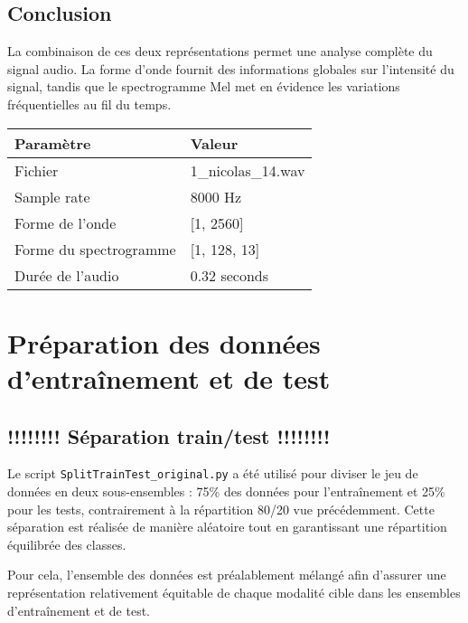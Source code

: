 \documentclass[11pt,a4paper]{article}
\begin{document}
\subsection{Conclusion}
La combinaison de ces deux représentations permet une analyse complète du signal audio. La forme d’onde fournit des informations globales sur l’intensité du signal, tandis que le spectrogramme Mel met en évidence les variations fréquentielles au fil du temps.

\begin{table}[h]
    \centering
    \renewcommand{\arraystretch}{1.2} %
    \begin{tabular}{>{\ttfamily}l l} 
        \toprule
        \textbf{Paramètre} & \textbf{Valeur} \\
        \midrule
        Fichier & 1\_nicolas\_14.wav \\
        Sample rate & 8000 Hz \\
        Forme de l'onde & [1, 2560] \\
        Forme du spectrogramme & [1, 128, 13] \\
        Durée de l'audio & 0.32 seconds \\
        \bottomrule
    \end{tabular}
\end{table}



\section{Préparation des données d'entraînement et de test}
\label{sec:preparation}

\subsection{!!!!!!!! Séparation train/test !!!!!!!!}
\label{subsec:split}

Le script \texttt{SplitTrainTest\_original.py} a été utilisé pour diviser le jeu de données en deux sous-ensembles : 75\% des données pour l'entraînement et 25\% pour les tests, contrairement à la répartition 80/20 vue précédemment. Cette séparation est réalisée de manière aléatoire tout en garantissant une répartition équilibrée des classes. 

Pour cela, l'ensemble des données est préalablement mélangé afin d'assurer une représentation relativement équitable de chaque modalité cible dans les ensembles d'entraînement et de test.
\end{document}
